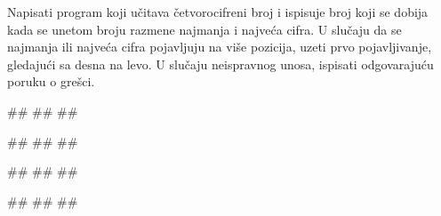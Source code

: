 \begin{Exercise}[label=KT_NG_15] 
 Napisati program koji učitava četvorocifreni broj i ispisuje broj koji se dobija 
 kada se unetom broju razmene najmanja i najveća cifra.  
 U slučaju da se najmanja ili najveća cifra pojavljuju na više pozicija, 
 uzeti prvo pojavljivanje, gledajući sa desna na levo.
 U slučaju neispravnog unosa, ispisati odgovarajuću poruku o grešci.
 
\begin{miditest}
\begin{upotreba}{1}
#\naslovInt#
##
##
\end{upotreba}
\end{miditest}
\begin{miditest}
\begin{upotreba}{2}
#\naslovInt#
##
##
\end{upotreba}
\end{miditest}

\begin{miditest}
\begin{upotreba}{3}
#\naslovInt#
##
##
\end{upotreba}
\end{miditest}
\begin{miditest}
\begin{upotreba}{4}
#\naslovInt#
##
##
\end{upotreba}
\end{miditest}

\end{Exercise}
\ifresenja
 \begin{Answer}[ref=KT_NG_15]
\end{Answer}
\fi


